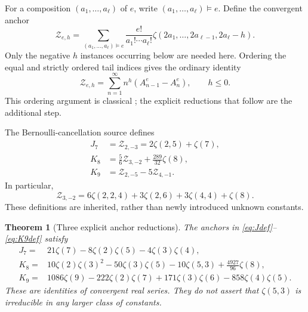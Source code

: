 \documentclass[11pt,letterpaper]{article}
\numberwithin{equation}{section}
\newtheorem{theorem}{Theorem}[section]
\theoremstyle{definition}\newtheorem{definition}[theorem]{Definition}
\theoremstyle{remark}\newtheorem{remark}[theorem]{Remark}
\begin{document}
For a composition $(a_1,\ldots,a_\ell)$ of $e$, write
$(a_1,\ldots,a_\ell)\vDash e$. Define the convergent anchor
\begin{equation}\label{eq:anchor}
 \mathcal Z_{e,h}=
 \sum_{(a_1,\ldots,a_\ell)\vDash e}
 \frac{e!}{a_1!\cdots a_\ell!}
 \zeta(2a_1,\ldots,2a_{\ell-1},2a_\ell-h).
\end{equation}
Only the negative $h$ instances occurring below are needed here.
Ordering the equal and strictly ordered tail indices gives the
ordinary identity
\begin{equation}\label{eq:anchor-drop}
 \mathcal Z_{e,h}
 =\sum_{n=1}^{\infty}n^h(A_{n-1}^e-A_n^e),\qquad h\le0.
\end{equation}
This ordering argument is classical \cite{Hoffman}; the explicit
reductions that follow are the additional step.

The Bernoulli-cancellation source defines
\begin{align}
 J_7&=\mathcal Z_{2,-3}=2\zeta(2,5)+\zeta(7),\label{eq:Jdef}\\
 K_8&=\frac56\mathcal Z_{3,-2}+\frac{289}{32}\zeta(8),\label{eq:K8def}\\
 K_9&=\mathcal Z_{2,-5}-5\mathcal Z_{4,-1}.\label{eq:K9def}
\end{align}
In particular,
\[
 \mathcal Z_{3,-2}
 =6\zeta(2,2,4)+3\zeta(2,6)+3\zeta(4,4)+\zeta(8).
\]
These definitions are inherited, rather than newly introduced
unknown constants.

\begin{theorem}[Three explicit anchor reductions]\label{thm:anchors}
The anchors in \eqref{eq:Jdef}--\eqref{eq:K9def} satisfy
\begin{align}
 J_7={}&21\zeta(7)-8\zeta(2)\zeta(5)
                                  -4\zeta(3)\zeta(4),\label{eq:J7}\\
 K_8={}&10\zeta(2)\zeta(3)^2-50\zeta(3)\zeta(5)
                -10\zeta(5,3)+\frac{4927}{96}\zeta(8),\label{eq:K8}\\
 K_9={}&1086\zeta(9)-222\zeta(2)\zeta(7)
                +171\zeta(3)\zeta(6)-858\zeta(4)\zeta(5).
 \label{eq:K9}
\end{align}
These are identities of convergent real series. They do not assert
that $\zeta(5,3)$ is irreducible in any larger class of constants.
\end{theorem}
\end{document}
